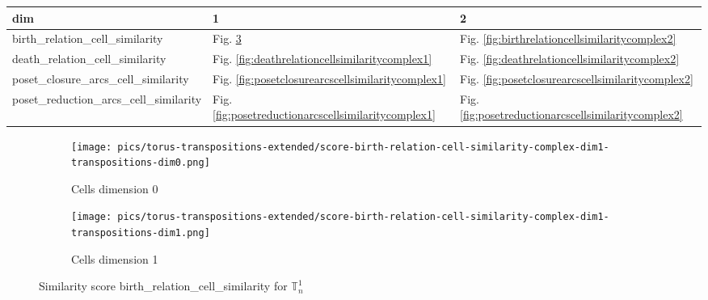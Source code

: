 \documentclass{article}
\begin{document}
\begin{tabular}{lll}
\toprule
dim & 1 & 2 \\
\midrule
birth\_relation\_cell\_similarity & Fig. \ref{fig:birthrelationcellsimilaritycomplex1} & Fig. \ref{fig:birthrelationcellsimilaritycomplex2} \\
death\_relation\_cell\_similarity & Fig. \ref{fig:deathrelationcellsimilaritycomplex1} & Fig. \ref{fig:deathrelationcellsimilaritycomplex2} \\
poset\_closure\_arcs\_cell\_similarity & Fig. \ref{fig:posetclosurearcscellsimilaritycomplex1} & Fig. \ref{fig:posetclosurearcscellsimilaritycomplex2} \\
poset\_reduction\_arcs\_cell\_similarity & Fig. \ref{fig:posetreductionarcscellsimilaritycomplex1} & Fig. \ref{fig:posetreductionarcscellsimilaritycomplex2} \\
\bottomrule
\end{tabular}
\begin{figure}[htbp]
\centering
\begin{subfigure}[b]{0.45\textwidth}
    \texttt{[image: pics/torus-transpositions-extended/score-birth-relation-cell-similarity-complex-dim1-transpositions-dim0.png]}
    \caption{Cells dimension 0}
    \label{fig:birthrelationcellsimilaritycomplex1cells0}
\end{subfigure}
\hfill
\begin{subfigure}[b]{0.45\textwidth}
    \texttt{[image: pics/torus-transpositions-extended/score-birth-relation-cell-similarity-complex-dim1-transpositions-dim1.png]}
    \caption{Cells dimension 1}
    \label{fig:birthrelationcellsimilaritycomplex1cells1}
\end{subfigure}
\caption{Similarity score birth\_relation\_cell\_similarity for $\mathbb{T}_n^{1}$}
\label{fig:birthrelationcellsimilaritycomplex1}
\end{figure}
\end{document}
